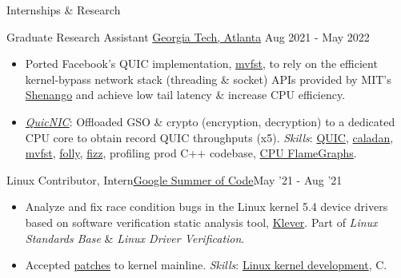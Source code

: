 \documentclass[]{mcdowellcv}
\begin{document}
    \begin{cvsection}{Internships \& Research}
        \begin{cvsubsection}
          {Graduate Research Assistant}
          {\href{https://scs.gatech.edu/}{Georgia Tech, Atlanta}}
          {Aug 2021 - May 2022}
            \begin{itemize}
                \item Ported Facebook's QUIC implementation, \href{https://github.com/facebookincubator/mvfst}{mvfst}, to rely on the efficient kernel-bypass network stack (threading \& socket) APIs provided by MIT's \href{https://www.usenix.org/conference/nsdi19/presentation/ousterhout}{Shenango} and achieve low tail latency \& increase CPU efficiency.
                \item \href{https://github.com/saubhik/caladan/pulls}{\textit{QuicNIC}}: Offloaded GSO \& crypto (encryption, decryption) to a dedicated CPU core to obtain record QUIC throughputs (x5). \textit{Skills}:
                \href{https://quicwg.org/}{QUIC},
                \href{https://github.com/shenango/caladan}{caladan}, \href{https://github.com/facebookincubator/mvfst}{mvfst}, \href{https://github.com/facebook/folly}{folly}, \href{https://github.com/facebookincubator/fizz}{fizz}, profiling prod C++ codebase, \href{https://www.brendangregg.com/FlameGraphs/cpuflamegraphs.html}{CPU FlameGraphs}.
            \end{itemize}
        \end{cvsubsection}

        \begin{cvsubsection}{Linux Contributor, Intern}{\href{https://summerofcode.withgoogle.com/archive/2021/projects/4818588170452992}{Google Summer of Code}}{May '21 - Aug '21}
            \begin{itemize}
                \item Analyze and fix race condition bugs in the Linux kernel 5.4 device drivers based on software verification static analysis tool, \href{https://forge.ispras.ru/projects/klever}{Klever}. Part of \textit{Linux Standards Base} \& \textit{Linux Driver Verification}.
                \item Accepted \href{https://lore.kernel.org/lkml/?q=saubhik}{patches} to kernel mainline. \textit{Skills}: \href{https://www.kernel.org/}{Linux kernel development}, C.
            \end{itemize}
        \end{cvsubsection}
    \end{cvsection}
\end{document}
